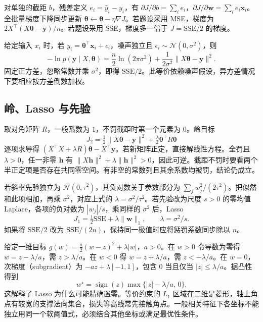 \documentclass[UTF8,a4paper,zihao=-4,fontset=fandol]{ctexrep}
\begin{document}
对单独的截距 \(b\)，残差定义 \(e_i=\hat y_i-y_i\)，有 \(\partial J/\partial b=\sum_i e_i\)，\(\partial J/\partial\bm w=\sum_i e_i\bm x_i\)。全批量梯度下降同步更新 \(\bm\theta\gets\bm\theta-\eta\nabla J\)。若题设采用 MSE，梯度为 \(2X^\top(X\bm\theta-\bm y)/n\)。若题设采用 SSE，梯度多一倍于 \(J=\mathrm{SSE}/2\) 的梯度。

给定输入 \(x_i\) 时，若 \(y_i=\bm\theta^\top\bm x_i+\epsilon_i\)，噪声独立且 \(\epsilon_i\sim\mathcal N(0,\sigma^2)\)，则
\[
 -\ln p(\bm y\mid X,\bm\theta)=\frac n2\ln(2\pi\sigma^2)
                       +\frac1{2\sigma^2}\|X\bm\theta-\bm y\|^2 .
\]
固定正方差，忽略常数并乘 \(\sigma^2\)，即得 \(\mathrm{SSE}/2\)。此等价依赖噪声假设，异方差情况下要相应按方差倒数加权。

\subsection*{岭、Lasso 与先验}
取对角矩阵 \(R\)，一般系数为 \(1\)，不罚截距时第一个元素为 \(0\)。岭目标
\[
 J_2=\tfrac12\|X\bm\theta-\bm y\|^2+\tfrac\lambda2\bm\theta^\top R\bm\theta
\]
逐项求导得 \((X^\top X+\lambda R)\bm\theta-X^\top\bm y\)。若新矩阵正定，直接解线性方程。全罚且 \(\lambda>0\)，任一非零 \(\bm h\) 有 \(\|X\bm h\|^2+\lambda\|\bm h\|^2>0\)，因此可逆。截距不罚时要看两个半正定项是否存在共同零空间。有非空的常数列且其余系数均被罚，结论仍成立。
 
若斜率先验独立为 \(\mathcal N(0,\tau^2)\)，其负对数关于参数部分为 \(\sum_jw_j^2/(2\tau^2)\)。把似然和此项相加，再乘 \(\sigma^2\)，对应上式的 \(\lambda=\sigma^2/\tau^2\)。若先验改为尺度 \(s>0\) 的零均值 Laplace，各项的负对数为 \(|w_j|/s\)，乘同样的 \(\sigma^2\) 后，Lasso
\[
 J_1=\tfrac12\mathrm{SSE}+\lambda\|\bm w\|_1,\qquad \lambda=\sigma^2/s.
\]
如果将 \(\mathrm{SSE}/2\) 改为 \(\mathrm{SSE}/(2n)\)，保持同一极值时应将惩罚系数同步除以 \(n\)。

给定一维目标 \(g(w)=\tfrac{a}{2}(w-z)^2+\lambda|w|\)，\(a>0\)。在 \(w>0\) 令导数为零得 \(w=z-\lambda/a\)，需 \(z>\lambda/a\)。在 \(w<0\) 得 \(w=z+\lambda/a\)，需 \(z<-\lambda/a\)。在 \(w=0\)，次梯度（subgradient）为 \(-az+\lambda[-1,1]\)，包含 \(0\) 当且仅当 \(|z|\le\lambda/a\)。据凸性得到
\[
 w^\star=\operatorname{sign}(z)\max\{|z|-\lambda/a,\,0\}.
\]
这解释了 Lasso 为什么可能精确置零。等价约束的 \(L_1\) 区域在二维是菱形，轴上角点有较宽的支撑法向集合，损失等高线常先接触角点。一般相关特征下各坐标不能独立用同一个软阈值式，必须结合其他坐标或满足最优性条件。
\end{document}
